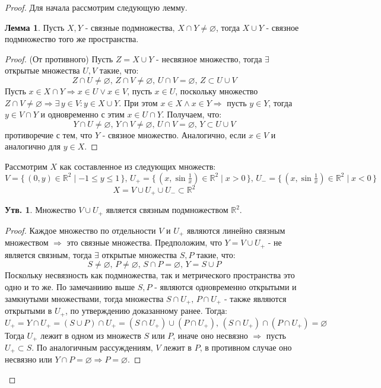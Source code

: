 \documentclass[12pt]{article}
\newcommand{\MR}{\mathbb{R}}
\newcommand{\VN}{\varnothing}
\theoremstyle{definition}
\newtheorem{prop}{Утв.}
\newtheorem{lemma}{Лемма}
\begin{document}
\begin{proof}
	Для начала рассмотрим следующую лемму.
	\begin{lemma}
		Пусть $X, Y$ - связные подмножества, $X \cap Y \neq \VN$, тогда $X \cup Y$ - связное подмножество того же пространства.
	\end{lemma}
	\begin{proof}
		(От противного) Пусть $Z = X \cup Y$ - несвязное множество, тогда $\exists$ открытые множества $U,V$ такие, что:
		$$
			Z \cap U \neq \VN,\, Z \cap V \neq \VN, \, U \cap V = \VN, \, Z \subset U \cup V
		$$
		Пусть $x \in X \cap Y \Rightarrow x \in U \vee x \in V$, пусть $x \in U$, поскольку множество $Z \cap V \neq \VN \Rightarrow \exists \, y \in V \colon y \in X \cup Y$. При этом $x \in X \wedge x \in Y \Rightarrow$ пусть $y \in Y$, тогда $y \in V \cap Y$ и одновременно с этим $x \in U \cap Y$. Получаем, что:
		$$
			Y \cap U \neq \VN, \, Y \cap V \neq \VN, \, U \cap V = \VN,\, Y \subset U \cup V 
		$$ 
		противоречие с тем, что $Y$ - связное множество. Аналогично, если $x \in V$ и аналогично для $y \in X$.
	\end{proof}
	Рассмотрим $X$ как составленное из следующих множеств:
	$$
		V = \{\, (0,y) \in 	\MR^2  \mid -1 \leq y \leq 1 \,\}, \, U_+ = \{\,(x, \sin{\tfrac{1}{x}}) \in \MR^2 \mid x > 0 \,\}, \, U_- = \{\,(x, \sin{\tfrac{1}{x}}) \in \MR^2 \mid x < 0 \,\}
	$$
	$$
		X = V \cup U_+ \cup U_{-} \subset \MR^2
	$$
	\begin{prop}
		Множество $V \cup U_{+}$ является связным подмножеством $\MR^2$.
	\end{prop}
	\begin{proof}
		Каждое множество по отдельности $V$ и $U_+$ являются линейно связным множеством $\Rightarrow$ это связные множества. Предположим, что $Y = V \cup U_+$ - не является связным, тогда $\exists$ открытые множества $S, P$ такие, что:
		$$
			S \neq \VN,\, P \neq \VN, \, S \cap P = \VN, \, Y = S \cup P
		$$
		Поскольку несвязность как подмножества, так и метрического пространства это одно и то же. По замечаниию выше $S, P$ - являются одновременно открытыми и замкнутыми множествами, тогда множества $S \cap U_+,\, P \cap U_+$ - также являются открытыми в $U_+$, по утверждению доказанному ранее. Тогда: 
		$$
			U_+ = Y \cap U_+ = (S \cup P) \cap U_+ = (S \cap U_+) \cup (P \cap U_+), \, (S \cap U_+) \cap (P \cap U_+) = \VN
		$$
		Тогда $U_+$ лежит в одном из множеств $S$ или $P$, иначе оно несвязно $\Rightarrow$ пусть $U_+ \subset S$. По аналогичным рассуждениям, $V$ лежит в $P$, в противном случае оно несвязно или $Y \cap P = \VN \Rightarrow P = \VN$. 
		

\end{proof}
\end{proof}
\end{document}
